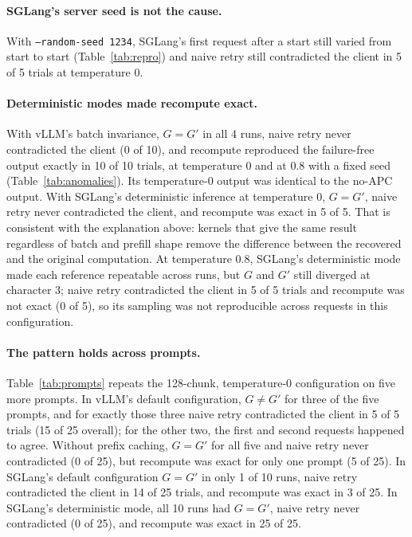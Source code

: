\documentclass[10pt,twocolumn]{article}
\begin{document}
\paragraph{SGLang's server seed is not the cause.} With
\texttt{--random-seed 1234}, SGLang's first request after a start still
varied from start to start (Table~\ref{tab:repro}) and naive retry still
contradicted the client in 5 of 5 trials at temperature 0.

\paragraph{Deterministic modes made recompute exact.} With vLLM's batch
invariance, $G=G'$ in all 4 runs, naive retry never contradicted the client
(0 of 10), and recompute reproduced the failure-free output exactly in 10 of
10 trials, at temperature 0 and at 0.8 with a fixed seed
(Table~\ref{tab:anomalies}). Its temperature-0 output was identical to the
no-APC output. With SGLang's deterministic inference at temperature 0,
$G=G'$, naive retry never contradicted the client, and recompute was exact
in 5 of 5. That is consistent with the explanation above: kernels that give
the same result regardless of batch and prefill shape remove the difference
between the recovered and the original computation. At temperature 0.8,
SGLang's deterministic mode made each reference repeatable across runs, but
$G$ and $G'$ still diverged at character 3; naive retry contradicted the
client in 5 of 5 trials and recompute was not exact (0 of 5), so its
sampling was not reproducible across requests in this configuration.

\paragraph{The pattern holds across prompts.} Table~\ref{tab:prompts}
repeats the 128-chunk, temperature-0 configuration on five more prompts. In
vLLM's default configuration, $G\neq G'$ for three of the five prompts, and
for exactly those three naive retry contradicted the client in 5 of 5
trials (15 of 25 overall); for the other two, the first and second requests
happened to agree. Without prefix caching, $G=G'$ for all five and naive
retry never contradicted (0 of 25), but recompute was exact for only one
prompt (5 of 25). In SGLang's default configuration $G=G'$ in only 1 of 10
runs, naive retry contradicted the client in 14 of 25 trials, and recompute
was exact in 3 of 25. In SGLang's deterministic mode, all 10 runs had
$G=G'$, naive retry never contradicted (0 of 25), and recompute was exact in
25 of 25.
\end{document}

